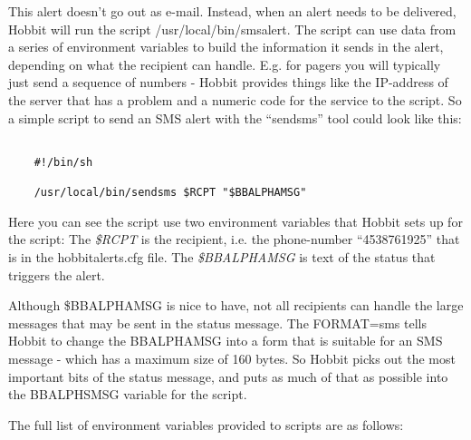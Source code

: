  This alert doesn't go out as e-mail. Instead, when an alert needs to be delivered, Hobbit will run the script /usr/local/bin/smsalert. The script can use data from a series of environment variables to build the information it sends in the alert, depending on what the recipient can handle. E.g. for pagers you will typically just send a sequence of numbers - Hobbit provides things like the IP-address of the server that has a problem and a numeric code for the service to the script. So a simple script to send an SMS alert with the ``sendsms'' tool could look like this:
\begin{verbatim}

	#!/bin/sh

	/usr/local/bin/sendsms $RCPT "$BBALPHAMSG"

\end{verbatim}


 Here you can see the script use two environment variables that Hobbit sets up for the script: The \emph{\$RCPT}
 is the recipient, i.e. the phone-number ``4538761925'' that is in the hobbitalerts.cfg file. The \emph{\$BBALPHAMSG}
 is text of the status that triggers the alert.


 Although \$BBALPHAMSG is nice to have, not all recipients can handle the large messages that may be sent in the status message. The FORMAT=sms tells Hobbit to change the BBALPHAMSG into a form that is suitable for an SMS message - which has a maximum size of 160 bytes. So Hobbit picks out the most important bits of the status message, and puts as much of that as possible into the BBALPHSMSG variable for the script.


 The full list of environment variables provided to scripts are as follows:


%




